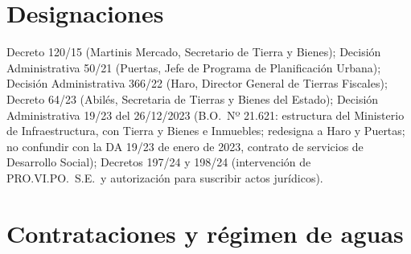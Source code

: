 \section*{Designaciones}

Decreto 120/15 (Martinis Mercado, Secretario de Tierra y Bienes); Decisión Administrativa 50/21 (Puertas, Jefe de Programa de Planificación Urbana); Decisión Administrativa 366/22 (Haro, Director General de Tierras Fiscales); Decreto 64/23 (Abilés, Secretaria de Tierras y Bienes del Estado); Decisión Administrativa 19/23 del 26/12/2023 (B.O.\ Nº 21.621: estructura del Ministerio de Infraestructura, con Tierra y Bienes e Inmuebles; redesigna a Haro y Puertas; no confundir con la DA 19/23 de enero de 2023, contrato de servicios de Desarrollo Social); Decretos 197/24 y 198/24 (intervención de PRO.VI.PO.\ S.E.\ y autorización para suscribir actos jurídicos).



\section*{Contrataciones y régimen de aguas}


